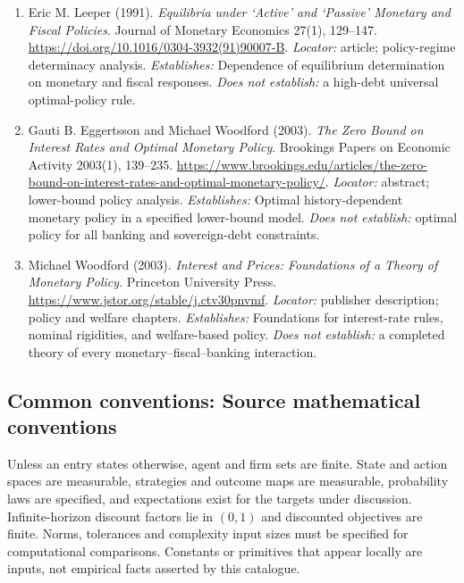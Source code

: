 \documentclass[11pt,a4paper]{article}
\begin{document}
\begin{enumerate}

\item[S1] Eric M. Leeper (1991). \emph{Equilibria under `Active' and `Passive' Monetary and Fiscal Policies}. Journal of Monetary Economics 27(1), 129--147. \url{https://doi.org/10.1016/0304-3932(91)90007-B}. \textit{Locator:} article; policy-regime determinacy analysis. \textit{Establishes:} Dependence of equilibrium determination on monetary and fiscal responses. \textit{Does not establish:} a high-debt universal optimal-policy rule.

\item[S2] Gauti B. Eggertsson and Michael Woodford (2003). \emph{The Zero Bound on Interest Rates and Optimal Monetary Policy}. Brookings Papers on Economic Activity 2003(1), 139--235. \url{https://www.brookings.edu/articles/the-zero-bound-on-interest-rates-and-optimal-monetary-policy/}. \textit{Locator:} abstract; lower-bound policy analysis. \textit{Establishes:} Optimal history-dependent monetary policy in a specified lower-bound model. \textit{Does not establish:} optimal policy for all banking and sovereign-debt constraints.

\item[S3] Michael Woodford (2003). \emph{Interest and Prices: Foundations of a Theory of Monetary Policy}. Princeton University Press. \url{https://www.jstor.org/stable/j.ctv30pnvmf}. \textit{Locator:} publisher description; policy and welfare chapters. \textit{Establishes:} Foundations for interest-rate rules, nominal rigidities, and welfare-based policy. \textit{Does not establish:} a completed theory of every monetary--fiscal--banking interaction.

\end{enumerate}

\subsection*{Common conventions: Source mathematical conventions}

Unless an entry states otherwise, agent and firm sets are finite. State and action spaces are measurable, strategies and outcome maps are measurable, probability laws are specified, and expectations exist for the targets under discussion. Infinite-horizon discount factors lie in $(0,1)$ and discounted objectives are finite. Norms, tolerances and complexity input sizes must be specified for computational comparisons. Constants or primitives that appear locally are inputs, not empirical facts asserted by this catalogue.
\end{document}
